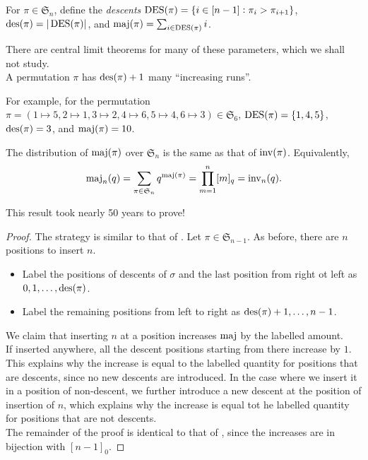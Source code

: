 	\begin{definition}[Descent]
		For $\pi \in \mathfrak{S}_n$, define the \emph{descents} $\operatorname{DES}(\pi) = \{i \in [n-1] : \pi_i > \pi_{i+1}\}$, $\operatorname{des}(\pi) = |\operatorname{DES}(\pi)|$, and $\operatorname{maj}(\pi) = \sum_{i \in \operatorname{DES}(\pi)} i$. 
	\end{definition}
	There are central limit theorems for many of these parameters, which we shall not study.\\
	A permutation $\pi$ has $\operatorname{des}(\pi) + 1$ many ``increasing runs''.

	For example, for the permutation $\pi = (1\mapsto 5,2\mapsto1,3\mapsto2,4\mapsto6,5\mapsto4,6\mapsto3) \in \mathfrak{S}_6$, $\operatorname{DES}(\pi) = \{1,4,5\}$, $\operatorname{des}(\pi) = 3$, and $\operatorname{maj}(\pi) = 10$.

	\begin{fprop}
		\label{prop: maj n}
		The distribution of $\operatorname{maj}(\pi)$ over $\mathfrak{S}_n$ is the same as that of $\operatorname{inv}(\pi)$. Equivalently,
		\[ \operatorname{maj}_n(q) = \sum_{\pi \in \mathfrak{S}_n} q^{\operatorname{maj}(\pi)} = \prod_{m=1}^n [m]_q = \operatorname{inv}_n(q). \] 
	\end{fprop}
	This result took nearly 50 years to prove!
	\begin{proof}
		The strategy is similar to that of . Let $\pi \in \mathfrak{S}_{n-1}$. As before, there are $n$ positions to insert $n$.
		\begin{itemize}
			\item Label the positions of descents of $\sigma$ and the last position from right ot left as $0,1,\ldots,\operatorname{des}(\pi)$.
			\item Label the remaining positions from left to right as $\operatorname{des}(\pi)+1,\ldots,n-1$.
		\end{itemize}
		We claim that inserting $n$ at a position increases $\operatorname{maj}$ by the labelled amount.\\
		If inserted anywhere, all the descent positions starting from there increase by $1$. This explains why the increase is equal to the labelled quantity for positions that are descents, since no new descents are introduced. In the case where we insert it in a position of non-descent, we further introduce a new descent at the position of insertion of $n$, which explains why the increase is equal tot he labelled quantity for positions that are not descents.\\
		The remainder of the proof is identical to that of , since the increases are in bijection with $[n-1]_0$.
	\end{proof}

